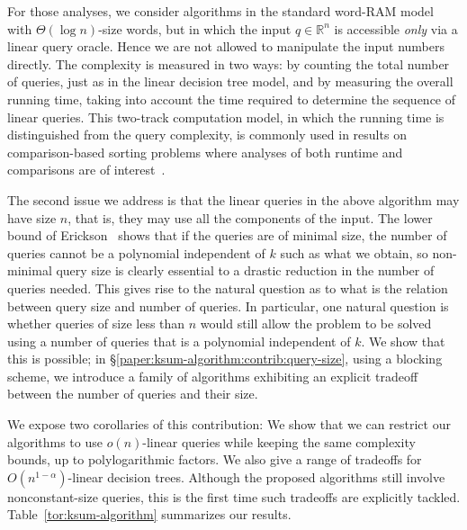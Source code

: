 For those analyses, we consider algorithms in the standard word-RAM model with
$\Theta(\log n)$-size words, but in which the input $q\in\mathbb{R}^n$ is
accessible \emph{only} via a linear query oracle. Hence we are not allowed to
manipulate the input numbers directly. The complexity is measured in two ways:
by counting the total number of queries, just as in the linear decision tree
model, and by measuring the overall running time, taking into account the time
required to determine the sequence of linear queries. This two-track
computation model, in which the running time is distinguished from the query
complexity, is commonly used in results on comparison-based sorting problems
where analyses of both runtime and comparisons are of
interest~\cite{SS95,CFJJM10,CFJJM13}.

The second issue we address is that the linear queries in the above algorithm may
have size $n$, that is, they may use all the components of the input.
The lower bound of Erickson~\cite{Er99a} shows that if the queries are of minimal size, the number
of queries cannot be a polynomial independent of $k$ such as what we obtain, so
non-minimal query size is clearly essential to a drastic reduction in the number of queries needed.
This gives rise to the natural question as to what is the relation between query size and number of queries.
In particular, one natural question is whether queries of size less than $n$
would still allow the problem to be solved using a number of queries that is a
polynomial independent of $k$. We show that this is possible; in
\S\ref{paper:ksum-algorithm:contrib:query-size},
using a blocking scheme,
we introduce a family of
algorithms exhibiting an explicit tradeoff between the number of queries and
their size.
%


We expose two corollaries of this contribution:
%
We show that we can restrict our algorithms to
use $o(n)$-linear queries while keeping the same complexity bounds, up to
polylogarithmic factors.
%
We also give a range of tradeoffs for $O(n^{1-\alpha})$-linear decision trees.
%
Although the proposed algorithms still involve nonconstant-size queries, this
is the first time such tradeoffs are explicitly tackled.
%
Table~\ref{tor:ksum-algorithm} summarizes our results.

